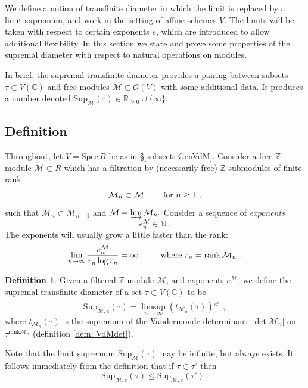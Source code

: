 \documentclass[a4paper,10pt]{amsart}
\theoremstyle{definition}
\newtheorem{defn}[thm]{Definition}
\theoremstyle{remark}
\numberwithin{equation}{section}
\newcommand{\Z}{\mathbb Z}
\newcommand{\C}{\mathbb C}
\newcommand{\R}{\mathbb R}
\newcommand{\Or}{\mathcal{O}}
\newcommand{\ts}{\mathrm{Sup}}
\newcommand{\rank}{\mathrm{rank}}
\newcommand{\0}{\color{blue}{\mathsf{0}}}
\begin{document}
  
  We define a notion of transfinite diameter in which the limit is replaced by a limit supremum, and work in the setting of  affine schemes $V$.  The limits will be taken with respect to  certain exponents $e$, which are introduced to allow additional flexibility. In this section we state and prove some properties of the supremal diameter with respect to natural operations on modules.
  
  In brief, the supremal transfinite diameter provides a pairing between subsets $\tau \subset V(\C)$ and free modules $\mathcal{M}\subset \Or(V)$ with some additional data. It produces a number denoted $\ts_{\mathcal{M}}(\tau) \in \R_{\geq 0} \cup \{\infty\}$. 
 
  \subsection{Definition} \label{sect: setupexponentfunctions}
  Throughout, let  $V = \mathrm{Spec} \, R$ be as in  \S\ref{subsect: GenVdM}. Consider  a free $\Z$-module 
  $\mathcal{M} \subset R$ which has a filtration by  (necessarily free) $\Z$-submodules  of finite rank
  \[  \mathcal{M}_n \subset \mathcal{M} \qquad \hbox{ for } n \geq 1 \ ,  \]
  such that $\mathcal{M}_n \subset \mathcal{M}_{n+1}$ and $\mathcal{M}= \varinjlim \mathcal{M}_n.$    Consider a sequence of  \emph{exponents} 
  \[  e_n^{\mathcal{M}} \in \mathbb{N} \ . \]
  The exponents will usually  grow a little faster than the rank: 
  \begin{equation}  \label{exponentgrowthcondition} 
  \lim_{n\rightarrow \infty}  \frac{ e_n^{\mathcal{M}}}{r_n \log r_n } = \infty\  \qquad \hbox{ where } r_n= \rank \, \mathcal{M}_n \ .
  \end{equation} 
  \begin{defn} Given a filtered $\Z$-module $\mathcal{M}$, and exponents $e^{\mathcal{M}}$, we define the supremal transfinite diameter of a set $\tau \subset V(\C)$  to be
  \[  \ts_{\mathcal{M},e} (\tau)=  \limsup_{n\rightarrow \infty}   \left(t_{\mathcal{M}_n}(\tau) \right)^{\frac{1}{e^{\mathcal{M}}_n}} \ ,\]
  where $t_{\mathcal{M}_n}(\tau)$ is the supremum of the Vandermonde determinant $|\det \mathcal{M}_n|$ on $\tau^{\rank \mathcal{M}_n}$  (definition \ref{defn: VdMdet}).
  \end{defn}
  Note that the limit supremum $\ts_{\mathcal{M}} (\tau)$ may be infinite, but always exists. It follows immediately from the definition that if $\tau \subset \tau'$ then
  \begin{equation}  \label{eqn: Subsetinequality}   \ts_{\mathcal{M},e} (\tau) \leq \ts_{\mathcal{M},e} (\tau') \ . 
  \end{equation}
  
\end{document}
